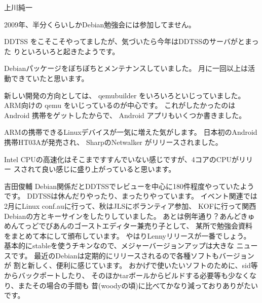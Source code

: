 
\begin{prework}{上川純一}

2009年、半分くらいしかDebian勉強会には参加してません。

DDTSS をこそこそやってましたが、気づいたら今年はDDTSSのサーバがとまった
りといろいろと起きたようです。

Debianパッケージをぼちぼちとメンテナンスしていました。
月に一回以上は活動できていたと思います。

新しい開発の方向としては、 qemubuilder をいろいろといじっていました。
ARM向けの qemu をいじっているのが中心です。
これがしたかったのは Android 携帯をゲットしたからで、
Android アプリもいくつか書きました。


ARMの携帯できるLinuxデバイスが一気に増えた気がします。
日本初のAndroid携帯HT03Aが発売され、
SharpのNetwalker がリリースされました。

Intel CPUの高速化はそこまですすんでいない感じですが、4コアのCPUがリリー
スされて良い感じに盛り上がっていると思います。

\end{prework}

\begin{prework}{吉田俊輔}
Debian関係だとDDTSSでレビューを中心に180件程度やっていたようです。
DDTSSは休んだりやったり、まったりやっています。
イベント関連では2月にLinux conf.auに行って、秋はJLSにボランティア参加、
KOFに行って関西Debianの方とキーサインをしたりしていました。
あとは例年通り？あんどきゅめんてっどでびあんのゴーストエディター兼売り子として、
某所で勉強会資料をまとめて本にして頒布しています。
やはりLennyリリースが一番でしょう。
基本的にstableを使うチキンなので、メジャーバージョンアップは大きな
ニュースです。
最近のDebianは定期的にリリースされるので各種ソフトもバージョンが
割と新しく、便利に感じています。
おかげで使いたいソフトのために、sid等からバックポートしたり、
そのほかtarボールからビルドする必要等も少なくなり、またその場合の手間も
昔(woodyの頃)に比べてかなり減っておりありがたいです。
\end{prework}


